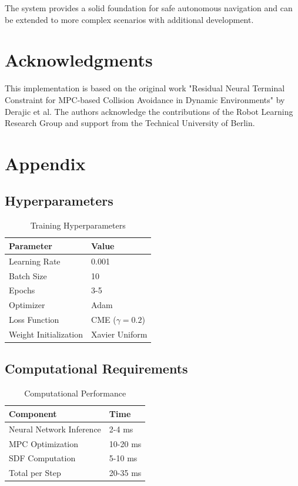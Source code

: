 \documentclass[12pt,a4paper]{article}
\begin{document}
The system provides a solid foundation for safe autonomous navigation and can be extended to more complex scenarios with additional development.

\section*{Acknowledgments}
This implementation is based on the original work "Residual Neural Terminal Constraint for MPC-based Collision Avoidance in Dynamic Environments" by Derajic et al. The authors acknowledge the contributions of the Robot Learning Research Group and support from the Technical University of Berlin.

\appendix
\section{Appendix}

\subsection{Hyperparameters}
\begin{table}[h!]
\centering
\caption{Training Hyperparameters}
\begin{tabular}{@{}ll@{}}
\toprule
\textbf{Parameter} & \textbf{Value} \\
\midrule
Learning Rate & 0.001 \\
Batch Size & 10 \\
Epochs & 3-5 \\
Optimizer & Adam \\
Loss Function & CME ($\gamma=0.2$) \\
Weight Initialization & Xavier Uniform \\
\bottomrule
\end{tabular}
\end{table}

\subsection{Computational Requirements}
\begin{table}[h!]
\centering
\caption{Computational Performance}
\begin{tabular}{@{}ll@{}}
\toprule
\textbf{Component} & \textbf{Time} \\
\midrule
Neural Network Inference & 2-4 ms \\
MPC Optimization & 10-20 ms \\
SDF Computation & 5-10 ms \\
Total per Step & 20-35 ms \\
\bottomrule
\end{tabular}
\end{table}
\end{document}
